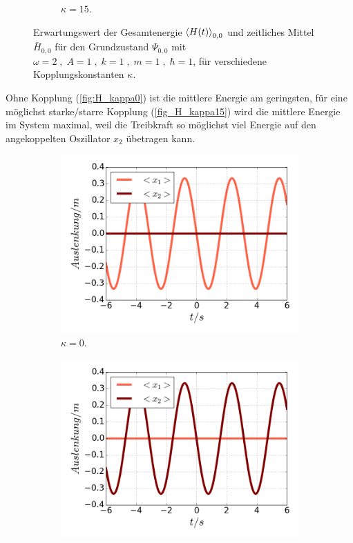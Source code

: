 \begin{figure}
\begin{subfigure}[t]{0.5\textwidth}
          \caption{$\kappa=15$.}
          \label{fig:H_kappa15}
      \end{subfigure}
      \caption{Erwartungswert der Gesamtenergie $\braket{H(t)}_{0,0}$ und zeitliches Mittel $\bar H_{0,0}$ für den Grundzustand $\Psi_{0,0}$ mit $\omega=2 \;,\; A=1 \;,\; k=1 \;,\; m=1 \;,\; \hbar=1$, für verschiedene Kopplungskonstanten $\kappa$.}
    \end{figure}
\fi
    Ohne Kopplung (\ref{fig:H_kappa0}) ist die mittlere Energie am geringsten, für eine möglichst starke/starre Kopplung (\ref{fig_H_kappa15}) wird die mittlere Energie im System maximal, weil die Treibkraft so möglichst viel Energie auf den angekoppelten Oszillator $x_2$ übetragen kann.
    \begin{figure}
      \begin{subfigure}[t]{0.5\textwidth}
        \centering
        \includegraphics[width=\textwidth]{plots/<x2>nl0.png}
        \caption{$\kappa=0$.}
        \label{fig:x2_null}
      \end{subfigure}
      \begin{subfigure}[t]{0.5\textwidth}
          \centering
          \includegraphics[width=\textwidth]{plots/<x1>nl0.png}

\end{subfigure}
\end{figure}
